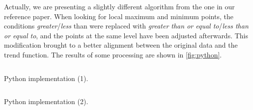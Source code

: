\documentclass[a4paper]{article}
\begin{document}
Actually, we are presenting a slightly different algorithm from the one in our reference paper. When looking for local maximum and minimum points, the conditions \emph{greater}/\emph{less} than were replaced with \emph{greater than or equal to}/\emph{less than or equal to}, and the points at the same level have been adjusted afterwards. This modification brought to a better alignment between the original data and the trend function. The results of some processing are shown in \cref{fig:python}.

\clearpage %



\begin{listing}%
 
\inputminted[firstline = 2, lastline = 47]{python}{../code/TPs_Python.py}

\caption{Python implementation (1).}\label{lst:python}

\end{listing}
 
\clearpage %

 
\begin{listing}[H]
 
\inputminted[firstline = 50, lastline = 90, breaklines = true]{python}{../code/TPs_Python.py}

\caption{Python implementation (2).}\label{lst:python2}

\end{listing}
 
\clearpage %
\end{document}
